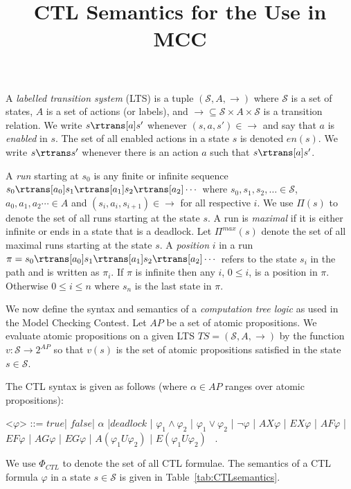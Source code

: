 \documentclass{article}
\title{CTL Semantics for the Use in MCC}
\newcommand{\rarc}[1]{\ensuremath{\xrightarrow{#1}}\xspace} %
\newcommand{\ctlformulas}{\ensuremath{\Phi_{\mathit{CTL}}}\xspace} %
\newcommand{\lts}{\ensuremath{TS}\xspace} %
\newcommand{\ltsstates}{\ensuremath{\mathcal{S}}\xspace} %
\newcommand{\ltslabels}{\ensuremath{A}\xspace} %
\newcommand{\ltsedges}{\ensuremath{\mathcal{\rightarrow}}\xspace} %
\newcommand{\deadlock}{\ensuremath{\mathit{deadlock}}\xspace}
\newcommand{\true}{\ensuremath{\mathit{true}}\xspace}
\newcommand{\false}{\ensuremath{\mathit{false}}\xspace}
\newcommand{\paths}{\ensuremath{\Pi}\xspace}
\newcommand{\maxpaths}{\ensuremath{\Pi^{\mathit{max}}}\xspace}
\newcommand{\en}{\ensuremath{en}\xspace}
\newcommand{\props}{\ensuremath{\mathit{AP}}\xspace}
\newcommand{\apeval}{\ensuremath{\mathit{v}}\xspace}
\begin{document}
\maketitle



A \emph{labelled transition system} (LTS) is a 
tuple $(\ltsstates, \ltslabels, \ltsedges)$ where $\ltsstates$ is a 
set of states, $\ltslabels$ is a set of actions (or labels), 
and $\ltsedges{} \subseteq \ltsstates \times \ltslabels \times \ltsstates$ is a transition relation. We write $s \rtrans[a] s'$ 
whenever $(s,a,s') \in \ltsedges$ and say that $a$ is \emph{enabled} in $s$.
The set of all enabled actions in a state $s$ is denoted $\en(s)$.
We write $s \rtrans s'$ whenever there is an action $a$ such that
$s \rtrans[a] s'$.

A \emph{run} starting at $s_0$ is any finite or infinite sequence
$s_0 \rtrans[a_0] s_1 \rtrans[a_1] s_2 \rtrans[a_2] \cdots$ where
$s_0, s_1, s_2, \ldots \in \ltsstates$, 
$a_0, a_1, a_2 \cdots \in \ltslabels$ and
$(s_i,a_i,s_{i+1}) \in \ltsedges$ for all respective $i$.
We use $\paths(s)$ to denote the set of all runs starting at the state $s$.
A run is \emph{maximal} if it is either infinite or ends in a state that
is a deadlock.  Let $\maxpaths(s)$ denote the set of all maximal 
runs starting at the state $s$.
A \emph{position} $i$ in a run $\pi = 
s_0 \rtrans[a_0] s_1 \rtrans[a_1] s_2 \rtrans[a_2] \cdots$
refers to the state $s_i$ in the path and is written as $\pi_i$.
If $\pi$ is infinite then any $i$, $0 \leq i$, is a position in $\pi$.
Otherwise $0 \leq i \leq n$ where $s_n$ is the last state in $\pi$.

We now define the syntax and semantics of a \emph{computation tree logic} 
as used in the Model Checking Contest.
Let \props be a set of atomic propositions.
We evaluate atomic propositions on a given LTS
$\lts = (\ltsstates, \ltslabels, \ltsedges)$ 
by the function $\apeval : \ltsstates \rarc{} 2^{\props}$ so that
 $\apeval(s)$ is the set of atomic propositions satisfied 
in the state $s \in \ltsstates$.

The CTL syntax is given as follows (where $\alpha \in \props$ ranges over atomic propositions):
\newcommand{\indalt}[1][2]{\\\hspace*{1pt}\textbar\hspace*{3.5pt}}
\begin{grammar}
    \let\syntleft\relax
    \let\syntright\relax

    <$\varphi$> ::= \true | \false | $\alpha$ |$\deadlock$ | $\varphi_{1} \land \varphi_{2}$ | $\varphi_{1} \lor \varphi_{2}$ | $ \neg\varphi$ 
| $\mathit{AX}\varphi$ | $\mathit{EX}\varphi$ | $\mathit{AF}\varphi$ | $\mathit{EF}\varphi$ | $\mathit{AG}\varphi$ | $\mathit{EG}\varphi$ | $\mathit{A}(\varphi_1\mathit{U}\varphi_2)$ | $\mathit{E}(\varphi_1\mathit{U}\varphi_2)$ \ .
\end{grammar}
We use \ctlformulas to denote the set of all CTL formulae.
The semantics of a CTL formula $\varphi$ in a state $s \in \ltsstates$ 
is given in Table~\ref{tab:CTLsemantics}. 
\end{document}
